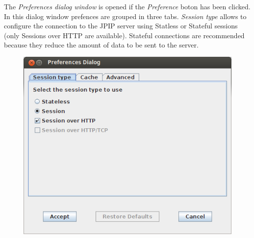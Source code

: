 \documentclass[a4paper,10pt]{article}
\begin{document}
The \emph{Preferences dialog window} is opened if the \emph{Preference} boton has
been clicked. In this dialog window prefences are grouped in three tabs.
\emph{Session type} allows to configure the connection to the JPIP server using
Statless or Stateful sessions (only Sessions over HTTP are available). Stateful
connections are recommended because they reduce the amount of data to be sent
to the server.
\begin{figure}[!h]
	\centering
	\includegraphics[scale=0.4]{images/CADIViewer-screenshot-PreferencesDialog_SessionType.png} \\
\end{figure}
\vspace*{0.5cm}
\end{document}
